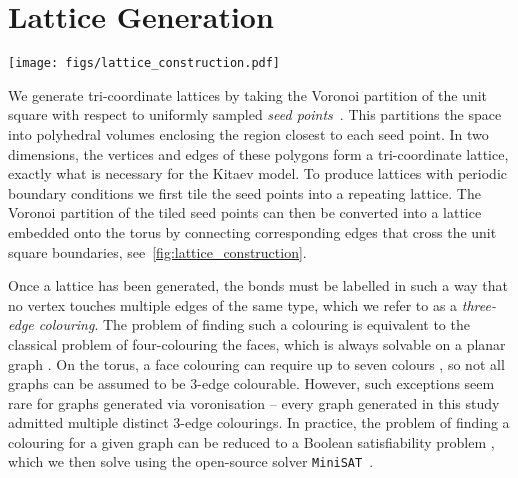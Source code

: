 \appendix

\section{Lattice Generation} \label{apx:lattice_construction}

\begin{figure*}[t]
    \centering
    \texttt{[image: figs/lattice\_construction.pdf]}
    \caption{(Left) The Voronoi partition (lines) splits a region up into polyhedra closer to one of the seed points (points) than any other. In two dimensions this yields a tri-coordinate lattice. Dotted lines go off to infinity. (Center) To create a lattice on the torus, we tile the seed points into a 3x3 grid and compute a Voronoi partition. By identifying pairs of edges (dotted lines) that cross the unit square (in grey) as the same we turn this lattice into on defined on the torus. (Right) The final tri-coordinate lattice in periodic boundary conditions, coloured such that all three colours meet at every vertex.}
    \label{fig:lattice_construction}
\end{figure*}

We generate tri-coordinate lattices by taking the Voronoi partition of the unit square with respect to uniformly sampled \textit{seed points}~\cite{florescu_designer_2009}. This partitions the space into polyhedral volumes enclosing the region closest to each seed point. In two dimensions, the vertices and edges of these polygons form a tri-coordinate lattice, exactly what is necessary for the Kitaev model.
To produce lattices with periodic boundary conditions we first tile the seed points into a repeating lattice. The Voronoi partition of the tiled seed points can then be converted into a lattice embedded onto the torus by connecting corresponding edges that cross the unit square boundaries, see~\cref{fig:lattice_construction}.

Once a lattice has been generated, the bonds must be labelled in such a way that no vertex touches multiple edges of the same type, which we refer to as a \textit{three-edge colouring}. The problem of finding such a colouring is equivalent to the classical problem of four-colouring the faces, which is always solvable on a planar graph \cite{Tait1880, appelEveryPlanarMap1989a}. On the torus, a face colouring can require up to seven colours \cite{ringel_solution_1968}, so not all graphs can be assumed to be 3-edge colourable. However, such exceptions seem rare for graphs generated via voronisation -- every graph generated in this study admitted multiple distinct 3-edge colourings. In practice, the problem of finding a colouring for a given graph can be reduced to a Boolean satisfiability problem \cite{Karp1972}, which we then solve using the open-source solver \texttt{MiniSAT}~\cite{imms-sat18}.


